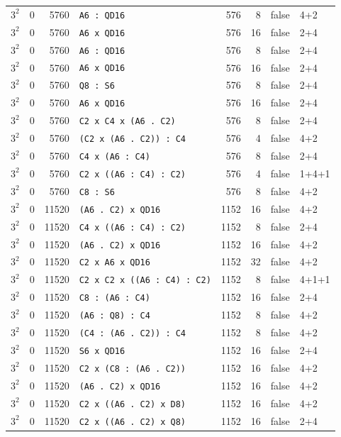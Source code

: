 \begin{longtable}{llrlrrll}
$3^2$ & 0 & 5760 & \texttt{A6 : QD16} & 576 & 8 & false & 4+2\\
$3^2$ & 0 & 5760 & \texttt{A6 x QD16} & 576 & 16 & false & 2+4\\
$3^2$ & 0 & 5760 & \texttt{A6 : QD16} & 576 & 8 & false & 2+4\\
$3^2$ & 0 & 5760 & \texttt{A6 x QD16} & 576 & 16 & false & 2+4\\
$3^2$ & 0 & 5760 & \texttt{Q8 : S6} & 576 & 8 & false & 2+4\\
$3^2$ & 0 & 5760 & \texttt{A6 x QD16} & 576 & 16 & false & 2+4\\
$3^2$ & 0 & 5760 & \texttt{C2 x C4 x (A6 . C2)} & 576 & 8 & false & 2+4\\
$3^2$ & 0 & 5760 & \texttt{(C2 x (A6 . C2)) : C4} & 576 & 4 & false & 4+2\\
$3^2$ & 0 & 5760 & \texttt{C4 x (A6 : C4)} & 576 & 8 & false & 2+4\\
$3^2$ & 0 & 5760 & \texttt{C2 x ((A6 : C4) : C2)} & 576 & 4 & false & 1+4+1\\
$3^2$ & 0 & 5760 & \texttt{C8 : S6} & 576 & 8 & false & 4+2\\
$3^2$ & 0 & 11520 & \texttt{(A6 . C2) x QD16} & 1152 & 16 & false & 4+2\\
$3^2$ & 0 & 11520 & \texttt{C4 x ((A6 : C4) : C2)} & 1152 & 8 & false & 2+4\\
$3^2$ & 0 & 11520 & \texttt{(A6 . C2) x QD16} & 1152 & 16 & false & 4+2\\
$3^2$ & 0 & 11520 & \texttt{C2 x A6 x QD16} & 1152 & 32 & false & 4+2\\
$3^2$ & 0 & 11520 & \texttt{C2 x C2 x ((A6 : C4) : C2)} & 1152 & 8 & false & 4+1+1\\
$3^2$ & 0 & 11520 & \texttt{C8 : (A6 : C4)} & 1152 & 16 & false & 2+4\\
$3^2$ & 0 & 11520 & \texttt{(A6 : Q8) : C4} & 1152 & 8 & false & 4+2\\
$3^2$ & 0 & 11520 & \texttt{(C4 : (A6 . C2)) : C4} & 1152 & 8 & false & 4+2\\
$3^2$ & 0 & 11520 & \texttt{S6 x QD16} & 1152 & 16 & false & 2+4\\
$3^2$ & 0 & 11520 & \texttt{C2 x (C8 : (A6 . C2))} & 1152 & 16 & false & 4+2\\
$3^2$ & 0 & 11520 & \texttt{(A6 . C2) x QD16} & 1152 & 16 & false & 4+2\\
$3^2$ & 0 & 11520 & \texttt{C2 x ((A6 . C2) x D8)} & 1152 & 16 & false & 4+2\\
$3^2$ & 0 & 11520 & \texttt{C2 x ((A6 . C2) x Q8)} & 1152 & 16 & false & 2+4\\

\end{longtable}
